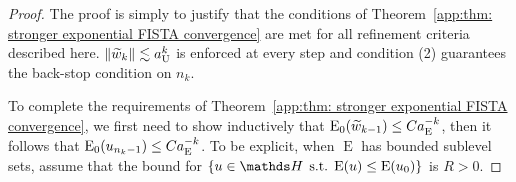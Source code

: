 \documentclass[smallextended]{svjour3}
\let\F\mathds\let\C\mathcal\newcommand{\R}{\F{R}}\newcommand{\A}{\tens{A}}
\newcommand{\norm}[1]{{\left\lVert #1 \right\rVert}}
\newcommand{\op}[1]{\operatorname{#1}}
\newcommand{\1}{\F{1}}
\DeclareMathOperator{\st}{\;s.t.\;}
\newcommand{\aU}{a_{\op{U}}}\newcommand{\aE}{a_{\op{E}}}
\newcommand*{\var}[1]{%
	\IfEqCase{#1}{%
		{0}{u}%
		{1}{v}%
		{2}{w}%
	}[u#1]%
}
\begin{document}
	\begin{lemma}\label{app:thm: practical refinement criteria}
	\end{lemma}
	\begin{proof}
		The proof is simply to justify that the conditions of Theorem~\ref{app:thm: stronger exponential FISTA convergence} are met for all refinement criteria described here. $\norm{\tilde{\var2}_k}\lesssim \aU^k$ is enforced at every step and condition (2) guarantees the back-stop condition on $n_k$.
		
		To complete the requirements of Theorem~\ref{app:thm: stronger exponential FISTA convergence}, we first need to show inductively that $\op{E}_0(\tilde{\var2}_{k-1}) \leq C\aE^{-k}$, then it follows that $\op{E}_0(\var0_{n_k-1})\leq C\aE^{-k}$. To be explicit, when $\op{E}$ has bounded sublevel sets, assume that the bound for $\{\var0\in\F H\st \op{E}(\var0)\leq \op{E}(\var0_0)\}$ is $R>0$.
		

\end{proof}
\end{document}
